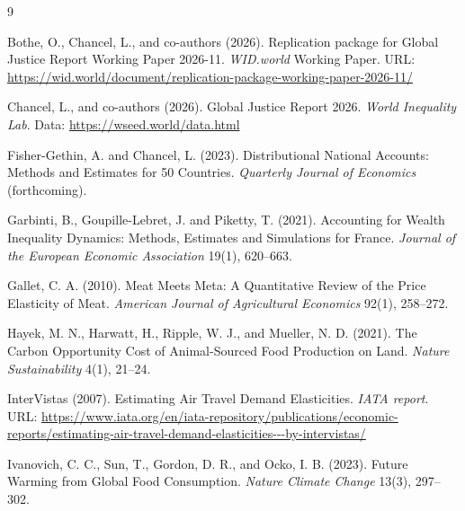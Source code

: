 \documentclass[12pt,a4paper]{article}
\begin{document}

\begin{thebibliography}{9}

Bothe, O., Chancel, L., and co-authors (2026).
\newblock Replication package for Global Justice Report Working Paper 2026-11.
\newblock \emph{WID.world} Working Paper.
\newblock URL: \url{https://wid.world/document/replication-package-working-paper-2026-11/}

Chancel, L., and co-authors (2026).
\newblock Global Justice Report 2026.
\newblock \emph{World Inequality Lab}.
\newblock Data: \url{https://wseed.world/data.html}

Fisher-Gethin, A. and Chancel, L. (2023).
\newblock Distributional National Accounts: Methods and Estimates for 50 Countries.
\newblock \emph{Quarterly Journal of Economics} (forthcoming).

Garbinti, B., Goupille-Lebret, J. and Piketty, T. (2021).
\newblock Accounting for Wealth Inequality Dynamics: Methods, Estimates and
Simulations for France.
\newblock \emph{Journal of the European Economic Association} 19(1), 620--663.

Gallet, C. A. (2010).
\newblock Meat Meets Meta: A Quantitative Review of the Price Elasticity of Meat.
\newblock \emph{American Journal of Agricultural Economics} 92(1), 258--272.

Hayek, M. N., Harwatt, H., Ripple, W. J., and Mueller, N. D. (2021).
\newblock The Carbon Opportunity Cost of Animal-Sourced Food Production on Land.
\newblock \emph{Nature Sustainability} 4(1), 21--24.

InterVistas (2007).
\newblock Estimating Air Travel Demand Elasticities.
\newblock \emph{IATA report}.
\newblock URL: \url{https://www.iata.org/en/iata-repository/publications/economic-reports/estimating-air-travel-demand-elasticities---by-intervistas/}

Ivanovich, C. C., Sun, T., Gordon, D. R., and Ocko, I. B. (2023).
\newblock Future Warming from Global Food Consumption.
\newblock \emph{Nature Climate Change} 13(3), 297--302.


\end{thebibliography}
\end{document}
